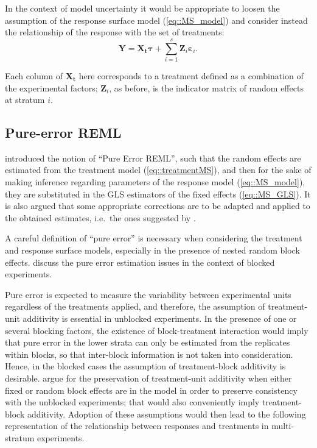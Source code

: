 In the context of model uncertainty it would be appropriate to loosen the assumption of the response surface model (\ref{eq::MS_model}) and consider instead the relationship of the response with the set of treatments:
\begin{equation}
\label{eq::treatmentMS}
\bm{Y}=\bm{X_t}\bm{\tau}+\sum_{i=1}^{s}\bm{Z}_{i}\bm{\varepsilon}_{i}.
\end{equation}

Each column of $\bm{X_t}$ here corresponds to a treatment defined as a combination of the experimental factors;
$\bm{Z}_{i}$, as before, is the indicator matrix of random effects at stratum $i$.

\subsection{Pure-error REML}
\cite{GilmourGoos2016PEREML} introduced the notion of ``Pure Error REML'', such that the random effects are estimated from the treatment model (\ref{eq::treatmentMS}), and then for the sake of making inference regarding parameters of the response model (\ref{eq::MS_model}), they are substituted in the GLS estimators of the fixed effects (\ref{eq::MS_GLS}). It is also argued that some appropriate corrections are to be adapted and applied to the obtained estimates, i.e.~the ones suggested by \cite{kenward1997small}. 

A careful definition of ``pure error'' is necessary when considering the treatment and response surface models, especially in the presence of nested random block effects. \cite{Gilmour2000PErsm} discuss the pure error estimation issues in the context of blocked experiments. 

Pure error is expected to measure the variability between experimental units regardless of the treatments applied, and therefore, the assumption of treatment-unit additivity is essential in unblocked experiments.  In the presence of one or several blocking factors, the existence of block-treatment interaction would imply that pure error in the lower strata can only be estimated from the replicates within blocks, so that inter-block information is not taken into consideration. Hence, in the blocked cases the assumption of treatment-block additivity \citep{Draper1998} is desirable. \cite{Gilmour2000PErsm} argue for the preservation of treatment-unit additivity when either fixed or random block effects are in the model in order to preserve consistency with the unblocked experiments; that would also conveniently imply treatment-block additivity. Adoption of these assumptions would then lead to the following representation of the relationship between responses and treatments in multi-stratum experiments. 

